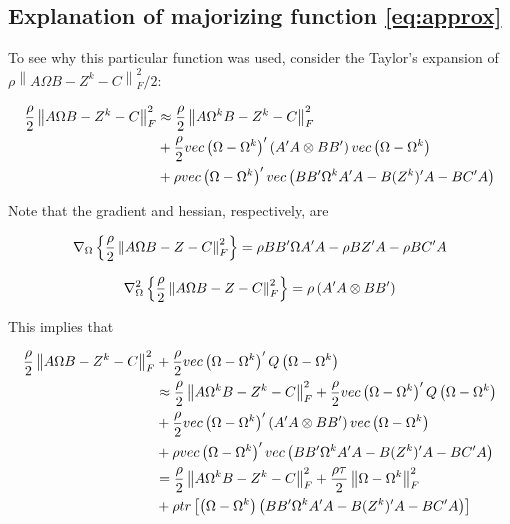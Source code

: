 \documentclass[11pt,]{report}
\theoremstyle{definition}
\theoremstyle{definition}
\theoremstyle{definition}
\theoremstyle{remark}
\begin{document}
\hypertarget{taylorsexp}{%
\subsection{Explanation of majorizing function \eqref{eq:approx}}\label{taylorsexp}}

To see why this particular function was used, consider the Taylor's expansion of \(\rho\left\|A\Omega B - Z^{k} - C\right\|_{F}^{2}/2\):

\begin{equation}
\begin{split}
  \frac{\rho}{2}\left\| A\Omega B - Z^{k} - C \right\|_{F}^{2} &\approx \frac{\rho}{2}\left\| A\Omega^{k} B - Z^{k} - C \right\|_{F}^{2} \\
  &+ \frac{\rho}{2}vec\left( \Omega - \Omega^{k}\right)'\left(A'A \otimes BB'\right)vec\left(\Omega - \Omega^{k}\right) \\
  &+ \rho vec\left(\Omega - \Omega^{k}\right)'vec\left(BB'\Omega^{k}A'A - B(Z^{k})'A - BC'A \right)
\end{split}
\label{eq:taylors}\notag
\end{equation}

Note that the gradient and hessian, respectively, are

\begin{equation}
  \nabla_{\Omega}\left\{ \frac{\rho}{2}\left\|A\Omega B - Z - C\right\|_{F}^{2} \right\} = \rho BB'\Omega A'A - \rho BZ'A - \rho BC'A
\label{eq:gradient}\notag
\end{equation}

\begin{equation}
\nabla_{\Omega}^{2}\left\{ \frac{\rho}{2}\left\|A\Omega B - Z - C \right\|_{F}^{2} \right\} = \rho\left(A'A \otimes BB' \right)
\label{eq:hessian}\notag
\end{equation}

This implies that

\begin{equation}
\begin{split}
  \frac{\rho}{2}\left\| A\Omega B - Z^{k} - C \right\|_{F}^{2} &+ \frac{\rho}{2}vec\left(\Omega - \Omega^{k} \right)'Q\left(\Omega - \Omega^{k} \right) \\
  &\approx \frac{\rho}{2}\left\| A\Omega^{k} B - Z^{k} - C \right\|_{F}^{2} + \frac{\rho}{2}vec\left(\Omega - \Omega^{k} \right)'Q\left(\Omega - \Omega^{k} \right) \\
  &+ \frac{\rho}{2}vec\left( \Omega - \Omega^{k}\right)'\left(A'A \otimes BB'\right)vec\left(\Omega - \Omega^{k}\right) \\
  &+ \rho vec\left(\Omega - \Omega^{k}\right)' vec\left(BB'\Omega^{k}A'A - B(Z^{k})'A - BC'A \right) \\
  &= \frac{\rho}{2}\left\| A\Omega^{k} B - Z^{k} - C \right\|_{F}^{2} + \frac{\rho\tau}{2}\left\|\Omega - \Omega^{k}\right\|_{F}^{2} \\
  &+ \rho tr\left[\left(\Omega - \Omega^{k}\right)\left(BB'\Omega^{k}A'A - B(Z^{k})'A - BC'A \right)\right]
\end{split}
\label{eq:penapprox}\notag
\end{equation}
\end{document}
